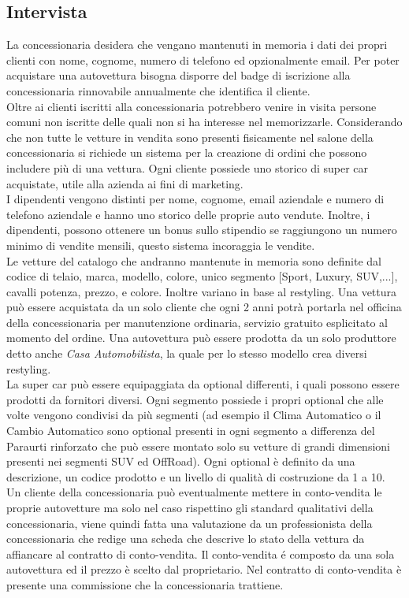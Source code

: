 \documentclass[11pt]{article}
\begin{document}
\subsection{Intervista}
La concessionaria desidera che vengano mantenuti in memoria i dati dei propri
clienti con nome, cognome, numero di telefono ed opzionalmente email. Per poter
acquistare una autovettura bisogna disporre del badge di iscrizione alla
concessionaria rinnovabile annualmente che identifica il cliente.\\
Oltre ai clienti iscritti alla concessionaria potrebbero venire in visita
persone comuni non iscritte delle quali non si ha interesse nel memorizzarle.
Considerando che non tutte le vetture in vendita sono presenti fisicamente nel
salone della concessionaria si richiede un sistema per la creazione di ordini
che possono includere più di una vettura. Ogni cliente possiede uno storico di
super car acquistate, utile alla azienda ai fini di marketing.\\
I dipendenti vengono distinti per nome, cognome, email aziendale e numero di
telefono aziendale e hanno uno storico delle proprie auto vendute. Inoltre, i
dipendenti, possono ottenere un bonus sullo stipendio se raggiungono un numero
minimo di vendite mensili, questo sistema incoraggia le vendite.\\
Le vetture del catalogo che andranno mantenute in memoria sono definite dal
codice di telaio, marca, modello, colore, unico segmento [Sport, Luxury,
SUV,...], cavalli potenza, prezzo, e colore. Inoltre variano in base al
restyling. Una vettura può essere acquistata da un solo cliente che ogni 2 anni
potrà portarla nel officina della concessionaria per manutenzione ordinaria,
servizio gratuito esplicitato al momento del ordine. Una autovettura può essere
prodotta da un solo produttore detto anche \textit{Casa Automobilista}, la quale
per lo stesso modello crea diversi restyling.\\
La super car può essere equipaggiata da optional differenti, i quali possono
essere prodotti da fornitori diversi. Ogni segmento possiede i propri optional
che alle volte vengono condivisi da più segmenti (ad esempio il Clima Automatico
o il Cambio Automatico sono optional presenti in ogni segmento a differenza del
Paraurti rinforzato che può essere montato solo su vetture di grandi dimensioni
presenti nei segmenti SUV ed OffRoad). Ogni optional è definito da una
descrizione, un codice prodotto e un livello di qualità di costruzione da 1 a
10.\\
Un cliente della concessionaria può eventualmente mettere in conto-vendita le
proprie autovetture ma solo nel caso rispettino gli standard qualitativi della
concessionaria, viene quindi fatta una valutazione da un professionista della
concessionaria che redige una scheda che descrive lo stato della vettura da
affiancare al contratto di conto-vendita. Il conto-vendita é composto da una
sola autovettura ed il prezzo è scelto dal proprietario. Nel contratto di
conto-vendita è presente una commissione che la concessionaria trattiene.
\end{document}
